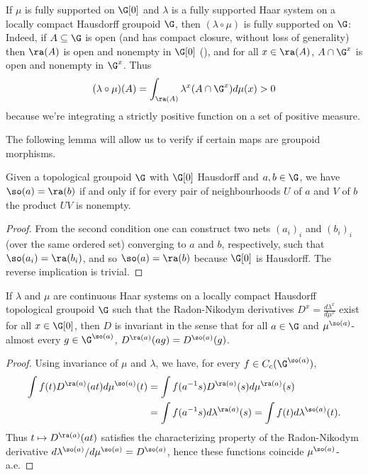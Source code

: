 If $\mu$ is fully supported on $\G[0]$ and $\lambda$ is a fully supported Haar system on a locally compact Hausdorff groupoid $\G$, then $(\lambda\circ\mu)$ is fully supported on $\G$: Indeed, if $A\subseteq\G$ is open (and has compact closure, without loss of generality) then $\ra(A)$ is open and nonempty in $\G[0]$ (\cite[Proposition 2.4]{MR584266}), and for all $x\in\ra(A)$, $A\cap\G^x$ is open and nonempty in $\G^x$. Thus
\[(\lambda\circ\mu)(A)=\int_{\ra(A)}\lambda^x(A\cap\G^x)d\mu(x)>0\]
because we're integrating a strictly positive function on a set of positive measure.

The following lemma will allow us to verify if certain maps are groupoid morphisms.

\begin{lemma}\label{lemmaproduct}
Given a topological groupoid $\G$ with $\G[0]$ Hausdorff and $a,b\in\G$, we have $\so(a)=\ra(b)$ if and only if for every pair of neighbourhoods $U$ of $a$ and $V$ of $b$ the product $UV$ is nonempty.
\end{lemma}
\begin{proof}
From the second condition one can construct two nets $(a_i)_i$ and $(b_i)_i$ (over the same ordered set) converging to $a$ and $b$, respectively, such that $\so(a_i)=\ra(b_i)$, and so $\so(a)=\ra(b)$ because $\G[0]$ is Hausdorff. The reverse implication is trivial.\qedhere
\end{proof}

\begin{lemma}\label{lemmaderivativehaar}
If $\lambda$ and $\mu$ are continuous Haar systems on a locally compact Hausdorff topological groupoid $\G$ such that the Radon-Nikodym derivatives $D^x=\frac{d\lambda^x}{d\mu^x}$ exist for all $x\in\G[0]$, then $D$ is invariant in the sense that for all $a\in\G$ and $\mu^{\so(a)}$-almost every $g\in\G^{\so(a)}$, $D^{\ra(a)}(ag)=D^{\so(a)}(g)$.
\end{lemma}
\begin{proof}
Using invariance of $\mu$ and $\lambda$, we have, for every $f\in C_c(\G^{\so(a)})$,
\begin{align*}
\int f(t) D^{\ra(a)}(at)d\mu^{\so(a)}(t)&=\int f(a^{-1}s)D^{\ra(a)}(s)d\mu^{\ra(a)}(s)\\
&=\int f(a^{-1}s)d\lambda^{\ra(a)}(s)=\int f(t)d\lambda^{\so(a)}(t).
\end{align*}
Thus $t\mapsto D^{\ra(a)}(at)$ satisfies the characterizing property of the Radon-Nikodym derivative $d\lambda^{\so(a)}/d\mu^{\so(a)}=D^{\so(a)}$, hence these functions coincide $\mu^{\so(a)}$-a.e.\qedhere
\end{proof}

